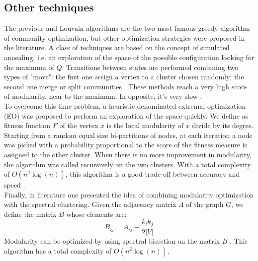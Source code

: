 \subsection{Other techniques}
The previous and Louvain algorithms are the two most famous greedy algorithm of community optimization, but other optimization strategies were proposed in the literature. A class of techniques are based on the concept of simulated annealing, i.e. an exploration of the space of the possible configuration looking for the maximum of $Q$. 
Transitions between states are performed combining two types of "move": the first one assign a vertex to a cluster chosen randomly; the second one merge or split communities \cite{Guimer__2005}. These methods reach a very high score of modularity, near to the maximum. In opposite, it's very slow \cite{fortunato}. \\
To overcome this time problem, a heuristic denominated extremal optimization (EO) was proposed to perform an exploration of the space quickly. We define as fitness function $F$ of the vertex $x$ is the local modularity of $x$ divide by its degree. Starting from a random equal size bi-partitions of nodes, at each iteration a node was picked with a probability proportional to the score of the fitness measure is assigned to the other cluster. When there is no more improvement in modularity, the algorithm was called recursively on the two clusters. With a total complexity of $O(n^2 \log(n))$, this algorithm is a good trade-off between accuracy and speed \cite{eo}.\\ Finally, in literature one presented the idea of combining modularity optimization with the spectral clustering. Given the adjacency matrix $A$ of the graph $G$, we define the matrix $B$ whose elements are:
\begin{equation}
B_{ij} = A_{ij} - \frac{k_ik_j}{2|V|}
\end{equation}
Modularity can be optimized by using spectral bisection on the matrix $B$ \cite{fortunato}. This algorithm has a total complexity of $O(n^2 \log(n))$.